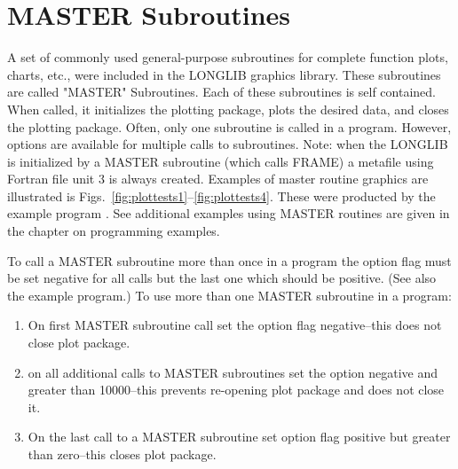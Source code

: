 \documentclass[11pt]{report}
\begin{document}
\chapter{MASTER Subroutines}

A set of commonly used general-purpose subroutines for complete
function plots, charts, etc., were included in the LONGLIB graphics
library.  These subroutines are called "MASTER" Subroutines.  Each of
these subroutines is self contained.  When called, it initializes the
plotting package, plots the desired data, and closes the plotting
package.  Often, only one  subroutine is called in a
program.  However, options are available for multiple calls
to  subroutines.  Note: when the LONGLIB is initialized by a
MASTER subroutine (which calls FRAME) a metafile using Fortran file
unit 3 is always created. Examples of master routine graphics are
illustrated is Figs.~\ref{fig:plottests1}--\ref{fig:plottests4}.  These
were producted by the example program .  See additional
examples using MASTER routines are given in the chapter on programming
examples.

To call a MASTER subroutine more than once in a program the option
flag must be set negative for all calls but the last one which should
be positive.  (See also the example  program.)  To use
more than one MASTER subroutine in a program:
\begin{enumerate}
\item  On first MASTER subroutine call 
set the option flag negative--this does not close plot package.
\item  on all additional calls to
MASTER subroutines set the option negative and greater than 10000--this
prevents re-opening plot package and does not close it.
\item  On the last call to a MASTER subroutine set option flag positive
but greater than zero--this closes plot package.
\end{enumerate}
\end{document}
